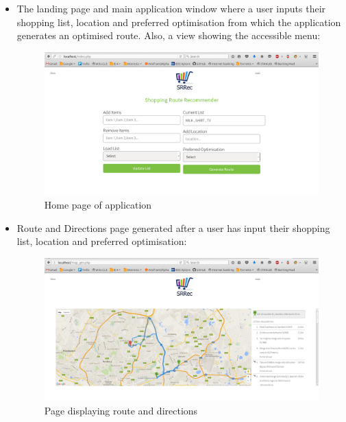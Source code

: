 \documentclass[10pt,twocolumn]{witseiepaper}
\begin{document}
\begin{itemize}
			\newpage
			\item The landing page and main application window where a user inputs their shopping list, location and preferred optimisation from which the application generates an optimised route. Also, a view showing the accessible menu:
			\begin{figure}[h!]
				\centering
				\includegraphics[width = \columnwidth]{../images/index_new.png}
				\caption{Home page of application}
				\label{home page}
			\end{figure}
			
			\item Route and Directions page generated after a user has input their shopping list, location and preferred optimisation:
			\begin{figure}[h!]
				\centering
				\includegraphics[width =\columnwidth]{../images/map_gen_new.png}
				\caption{Page displaying route and directions}
				\label{map page}
			\end{figure}
			

\end{itemize}
\end{document}
